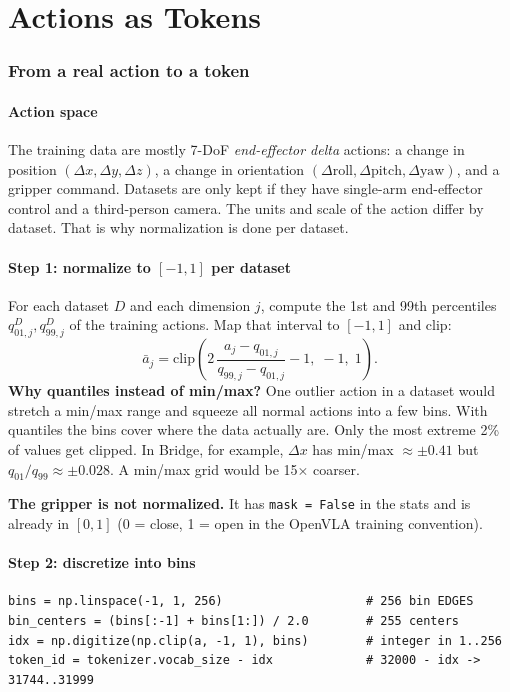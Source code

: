 \documentclass[11pt]{article}
\begin{document}
\part{Actions as Tokens}

\section{From a real action to a token}
\label{sec:tok}

\subsection{Action space}
The training data are mostly 7-DoF \emph{end-effector delta} actions: a change in position $(\Delta x,\Delta y,\Delta z)$, a change in orientation $(\Delta\text{roll},\Delta\text{pitch},\Delta\text{yaw})$, and a gripper command. Datasets are only kept if they have single-arm end-effector control and a third-person camera. The units and scale of the action differ by dataset. That is why normalization is done per dataset.

\subsection{Step 1: normalize to $[-1,1]$ per dataset}
For each dataset $D$ and each dimension $j$, compute the 1st and 99th percentiles $q^{D}_{01,j}, q^{D}_{99,j}$ of the training actions. Map that interval to $[-1,1]$ and clip:
\begin{equation}
\bar a_j = \mathrm{clip}\!\left(2\,\frac{a_j - q_{01,j}}{q_{99,j}-q_{01,j}} - 1,\;-1,\;1\right).
\end{equation}
\textbf{Why quantiles instead of min/max?} One outlier action in a dataset would stretch a min/max range and squeeze all normal actions into a few bins. With quantiles the bins cover where the data actually are. Only the most extreme 2\% of values get clipped. In Bridge, for example, $\Delta x$ has min/max $\approx\pm0.41$ but $q_{01}/q_{99}\approx\pm0.028$. A min/max grid would be 15$\times$ coarser.

\textbf{The gripper is not normalized.} It has \texttt{mask = False} in the stats and is already in $[0,1]$ (0 = close, 1 = open in the OpenVLA training convention).

\subsection{Step 2: discretize into bins}
\begin{lstlisting}
bins = np.linspace(-1, 1, 256)                    # 256 bin EDGES
bin_centers = (bins[:-1] + bins[1:]) / 2.0        # 255 centers
idx = np.digitize(np.clip(a, -1, 1), bins)        # integer in 1..256
token_id = tokenizer.vocab_size - idx             # 32000 - idx -> 31744..31999
\end{lstlisting}
\end{document}
